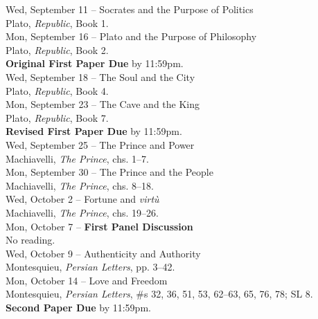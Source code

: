\documentclass [11pt]{article}
\begin{document}
\noindent
Wed, September 11 -- Socrates and the Purpose of Politics  \\
\phantom{Wed, September 11 -- }Plato, \textit{Republic}, Book 1. \\

\noindent
Mon, September 16 -- Plato and the Purpose of Philosophy \\
\phantom{Mon, September 16 -- }Plato, \textit{Republic}, Book 2. \\
\phantom{Mon, September 16 -- }\textbf{Original First Paper Due} by 11:59pm. \\

\noindent
Wed, September 18 -- The Soul and the City \\
\phantom{Wed, September 18 -- }Plato, \textit{Republic}, Book 4. \\ 

\noindent
Mon, September 23 -- The Cave and the King \\
\phantom{Mon, September 23 -- }Plato, \textit{Republic}, Book 7. \\
\phantom{Mon, September 23 -- }\textbf{Revised First Paper Due} by 11:59pm. \\

\noindent
Wed, September 25 -- The Prince and Power \\
\phantom{Wed, September 25 -- }Machiavelli, \textit{The Prince}, chs. 1--7.  \\

\noindent
Mon, September 30 -- The Prince and the People \\
\phantom{Mon, September 30 -- }Machiavelli, \textit{The Prince}, chs. 8--18. \\

\noindent
Wed, October 2 -- Fortune and \emph{virt\`u} \\
\phantom{Wed, October 2 -- }Machiavelli, \textit{The Prince}, chs. 19--26.\\

\noindent
Mon, October 7 -- \textbf{First Panel Discussion} \\
\phantom{Mon, October 7 -- }No reading. \\

\noindent
Wed, October 9 -- Authenticity and Authority \\ 
\phantom{Wed, October 9 -- }Montesquieu, \textit{Persian Letters}, pp. 3--42. \\

\noindent
Mon, October 14 -- Love and Freedom \\
\phantom{Mon, October 14 -- }Montesquieu, \textit{Persian Letters}, \#s 32, 36, 51, 53, 62--63, 65, 76, 78; SL 8. \\
\phantom{Mon, October 14 -- }\textbf{Second Paper Due} by 11:59pm. \\
\end{document}
